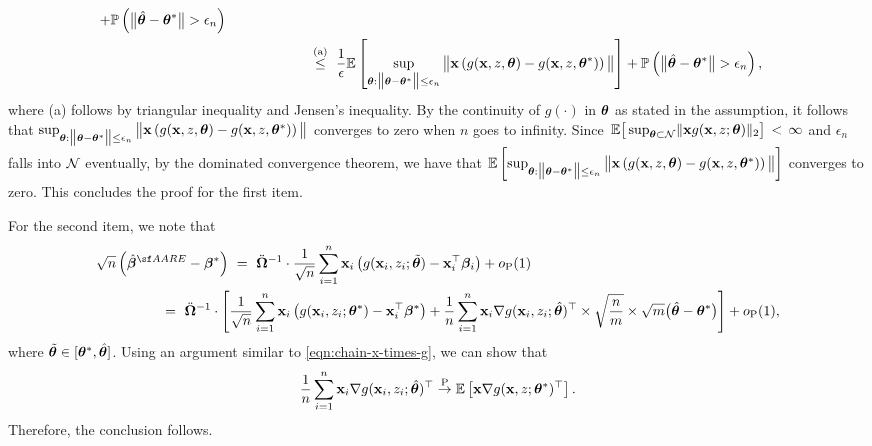 {\begin{align}
+ \mathbb{P}\left(
\big \lVert
\hat{\bm{\theta}} - \bm{\theta}^*
\big \rVert > \epsilon_n
\right) \\
&~~~~~~~~~~~~~~~~~~\stackrel{\text{(a)}}{\leq}~ 
\frac{1}{\epsilon}\mathbb{E}\left[\sup_{{\bm{\theta}}: \big \lVert
{\bm{\theta}} - \bm{\theta}^*
\big \rVert \leq \epsilon_n}\big\lVert \mathbf{x} 
    \left(g(\mathbf{x}, z, {\bm{\theta}})-g(\mathbf{x}, z, {\bm{\theta}}^*)\right)\big \rVert\right]
+ \mathbb{P}\left(
\big \lVert
\hat{\bm{\theta}} - \bm{\theta}^*
\big \rVert > \epsilon_n
\right), 
\end{align}
where (a) follows by triangular inequality and Jensen's inequality. 
By the continuity of $g(\cdot)$ in $\bm{\theta}$ as stated in the assumption, it follows that $\sup_{{\bm{\theta}}: \big \lVert
{\bm{\theta}} - \bm{\theta}^*
\big \rVert \leq \epsilon_n}\big\lVert \mathbf{x} 
    \left(g(\mathbf{x}, z, {\bm{\theta}})-g(\mathbf{x}, z, {\bm{\theta}}^*)\right)\big \rVert$ converges to zero when $n$ goes to infinity. 
    Since $\,\mathbb{E}\big[\sup_{\bm{\theta} \subset \mathcal{N}}\lVert  \mathbf{x} g(\mathbf{x}, z; \bm{\theta}) \rVert_2\big] \,<\, \infty$ and $\epsilon_n$ falls into $\mathcal{N}$ eventually, by the dominated convergence theorem, we have that $\mathbb{E}\left[\sup_{{\bm{\theta}}: \big \lVert
{\bm{\theta}} - \bm{\theta}^*
\big \rVert \leq \epsilon_n}\big\lVert \mathbf{x} 
    \left(g(\mathbf{x}, z, {\bm{\theta}})-g(\mathbf{x}, z, {\bm{\theta}}^*)\right)\big \rVert\right]$ converges to zero. 
    This concludes the proof for the first item. 

    For the second item, we note that 
    \begin{align*}
        & \sqrt{n}\left(\hat{\betavec}^{\sf AARE} - \betavec^* \right)~=~ \ddot{\mathbf{\Omega}}^{-1} \cdot\frac{1}{\sqrt{n}}\sum_{i=1}^n\x_i \left(g(\x_i, z_i; \tilde{\thetavec}) - \x_i^{\top} \betavec_i\right) + o_{\text{P}}(1)\\&~~~~~~~~~~~~~~=~ \ddot{\mathbf{\Omega}}^{-1} \cdot\left[\frac{1}{\sqrt{n}}\sum_{i=1}^n\x_i \left(g(\x_i, z_i; {\thetavec}^*)
        - \x_i^\top \betavec^*
        \right)+ \frac{1}{n}\sum_{i=1}^n\x_i \nabla g(\x_i, z_i; \hat{\thetavec})^{\top}\times 
        \sqrt{\frac{n}{m}} \times \sqrt{m}\big(
    \hat{\thetavec} - \thetavec^*
    \big)\right] + o_{\text{P}}(1),
    \end{align*}
    where $\tilde{\bm{\theta}} \in [\bm{\theta}^*, \hat{\bm{\theta}}]$.
    Using an argument similar to \eqref{eqn:chain-x-times-g}, we can show that  
    $$\frac{1}{n}\sum_{i=1}^n\mathbf{x}_i \nabla g(\mathbf{x}_i, z_i; \hat{\bm{\theta}})^{\top} \overset{\text{\upshape{P}}}{\rightarrow} \mathbb{E}\left[\mathbf{x} \nabla g(\mathbf{x}, z;{\bm{\theta}}^*)^{\top}  \right].$$
    Therefore, the conclusion follows. 

}
